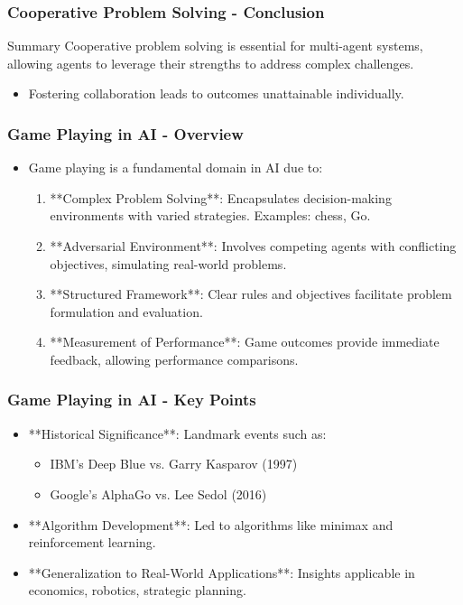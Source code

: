 \documentclass[aspectratio=169]{beamer}
\begin{document}
\begin{frame}[fragile]
    \frametitle{Cooperative Problem Solving - Conclusion}
    \begin{block}{Summary}
        Cooperative problem solving is essential for multi-agent systems, allowing agents to leverage their strengths to address complex challenges. 
        \begin{itemize}
            \item Fostering collaboration leads to outcomes unattainable individually.
        \end{itemize}
    \end{block}
\end{frame}

\begin{frame}[fragile]
    \frametitle{Game Playing in AI - Overview}
    \begin{itemize}
        \item Game playing is a fundamental domain in AI due to:
        \begin{enumerate}
            \item **Complex Problem Solving**: Encapsulates decision-making environments with varied strategies. Examples: chess, Go.
            \item **Adversarial Environment**: Involves competing agents with conflicting objectives, simulating real-world problems.
            \item **Structured Framework**: Clear rules and objectives facilitate problem formulation and evaluation.
            \item **Measurement of Performance**: Game outcomes provide immediate feedback, allowing performance comparisons.
        \end{enumerate}
    \end{itemize}
\end{frame}

\begin{frame}[fragile]
    \frametitle{Game Playing in AI - Key Points}
    \begin{itemize}
        \item **Historical Significance**: Landmark events such as:
        \begin{itemize}
            \item IBM's Deep Blue vs. Garry Kasparov (1997)
            \item Google's AlphaGo vs. Lee Sedol (2016)
        \end{itemize}
        \item **Algorithm Development**: Led to algorithms like minimax and reinforcement learning.
        \item **Generalization to Real-World Applications**: Insights applicable in economics, robotics, strategic planning.
    \end{itemize}
\end{frame}
\end{document}

